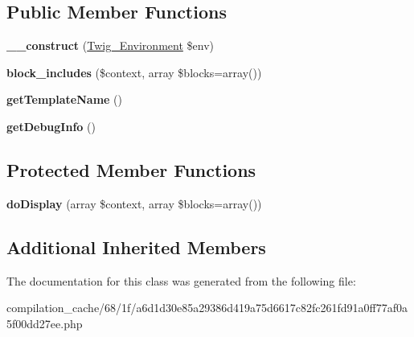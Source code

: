 \subsection*{Public Member Functions}
\begin{DoxyCompactItemize}
\item 
\hypertarget{class_____twig_template__681fa6d1d30e85a29386d419a75d6617c82fc261fd91a0ff77af0a5f00dd27ee_a4f8326243132c1450a81e0a817aa1be7}{}{\bfseries \+\_\+\+\_\+construct} (\hyperlink{class_twig___environment}{Twig\+\_\+\+Environment} \$env)\label{class_____twig_template__681fa6d1d30e85a29386d419a75d6617c82fc261fd91a0ff77af0a5f00dd27ee_a4f8326243132c1450a81e0a817aa1be7}

\item 
\hypertarget{class_____twig_template__681fa6d1d30e85a29386d419a75d6617c82fc261fd91a0ff77af0a5f00dd27ee_aa16f29e2939d91d00a00d8deb8fde500}{}{\bfseries block\+\_\+includes} (\$context, array \$blocks=array())\label{class_____twig_template__681fa6d1d30e85a29386d419a75d6617c82fc261fd91a0ff77af0a5f00dd27ee_aa16f29e2939d91d00a00d8deb8fde500}

\item 
\hypertarget{class_____twig_template__681fa6d1d30e85a29386d419a75d6617c82fc261fd91a0ff77af0a5f00dd27ee_a621a3ccd148ed8b9e937da6959c98f39}{}{\bfseries get\+Template\+Name} ()\label{class_____twig_template__681fa6d1d30e85a29386d419a75d6617c82fc261fd91a0ff77af0a5f00dd27ee_a621a3ccd148ed8b9e937da6959c98f39}

\item 
\hypertarget{class_____twig_template__681fa6d1d30e85a29386d419a75d6617c82fc261fd91a0ff77af0a5f00dd27ee_abd0ecb0136f4228db2bd963bfc1e20d7}{}{\bfseries get\+Debug\+Info} ()\label{class_____twig_template__681fa6d1d30e85a29386d419a75d6617c82fc261fd91a0ff77af0a5f00dd27ee_abd0ecb0136f4228db2bd963bfc1e20d7}

\end{DoxyCompactItemize}
\subsection*{Protected Member Functions}
\begin{DoxyCompactItemize}
\item 
\hypertarget{class_____twig_template__681fa6d1d30e85a29386d419a75d6617c82fc261fd91a0ff77af0a5f00dd27ee_adb62b7c226e07d30f836ed16158d924f}{}{\bfseries do\+Display} (array \$context, array \$blocks=array())\label{class_____twig_template__681fa6d1d30e85a29386d419a75d6617c82fc261fd91a0ff77af0a5f00dd27ee_adb62b7c226e07d30f836ed16158d924f}

\end{DoxyCompactItemize}
\subsection*{Additional Inherited Members}


The documentation for this class was generated from the following file\+:\begin{DoxyCompactItemize}
\item 
compilation\+\_\+cache/68/1f/a6d1d30e85a29386d419a75d6617c82fc261fd91a0ff77af0a5f00dd27ee.\+php\end{DoxyCompactItemize}
